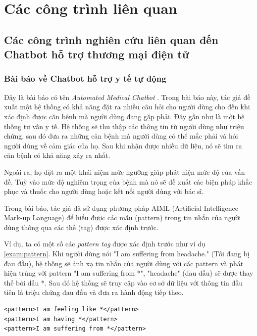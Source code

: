 \chapter{Các công trình liên quan}

\section{Các công trình nghiên cứu liên quan đến Chatbot hỗ trợ thương mại điện tử}
\subsection{Bài báo về Chatbot hỗ trợ y tế tự động}
Đây là bài báo có tên \textit{Automated Medical Chatbot} \cite{automatedmedical}. Trong bài báo này, tác giả đề xuất một hệ thống có khả năng đặt ra nhiều câu hỏi cho người dùng cho đến khi xác định được căn bệnh mà người dùng đang gặp phải. Đây gần như là một hệ thống tư vấn y tế. Hệ thống sẽ thu thập các thông tin từ người dùng như triệu chứng, sau đó đưa ra những căn bệnh mà người dùng có thể mắc phải và hỏi người dùng về cảm giác của họ. Sau khi nhận được nhiều dữ liệu, nó sẽ tìm ra căn bệnh có khả năng xảy ra nhất.

Ngoài ra, họ đặt ra một khái niệm mức ngưỡng giúp phát hiện mức độ của vấn đề. Tuỳ vào mức độ nghiêm trọng của bệnh mà nó sẽ đề xuất các biện pháp khắc phục và thuốc cho người dùng hoặc kết nối người dùng với bác sĩ.

Trong bài báo, tác giả đã sử dụng phương pháp AIML (Artificial Intelligence Mark-up Language) để hiểu được các mẫu (pattern) trong tin nhắn của người dùng thông qua các thẻ (tag) được xác định trước.

Ví dụ, ta có một số các \textit{pattern tag} được xác định trước như ví dụ \ref{exam:pattern}. Khi người dùng nói "I am suffering from headache." (Tôi đang bị đau đầu), hệ thống sẽ ánh xạ tin nhắn của người dùng với các pattern và phát hiện trùng với pattern "I am suffering from *", "headache" (đau đầu) sẽ được thay thế bởi dấu *. Sau đó hệ thống sẽ truy cập vào cơ sở dữ liệu với thông tin đầu tiên là triệu chứng đau đầu và đưa ra hành động tiếp theo.

\renewcommand{\lstlistingname}{Ví dụ}
\begin{lstlisting}[caption={Một số các pattern tag},label={exam:pattern},language=exam_en,firstnumber=1]
<pattern>I am feeling like *</pattern>
<pattern>I am having *</pattern>
<pattern>I am suffering from *</pattern>
\end{lstlisting}

